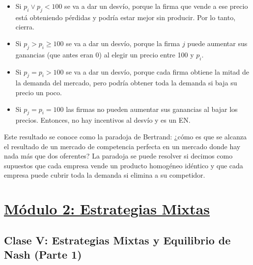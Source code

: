 \documentclass{article}
\begin{document}
                \begin{itemize}
                    \item Si \(p_{i} \vee p_{j} < 100\) se va a dar un desvío, porque la firma que vende a ese precio está obteniendo pérdidas y podría estar mejor sin producir. Por lo tanto, cierra.
                    \item Si \(p_{j} > p_{i} \geq 100\) se va a dar un desvío, porque la firma \(j\) puede aumentar sus ganancias (que antes eran 0) al elegir un precio entre 100 y \(p_{i}\).
                    \item Si \(p_{j} = p_{i} > 100\) se va a dar un desvío, porque cada firma obtiene la mitad de la demanda del mercado, pero podría obtener toda la demanda si baja su precio un poco.
                    \item Si \(p_{j} = p_{i} = 100\) las firmas no pueden aumentar sus ganancias al bajar los precios. Entonces, no hay incentivos al desvío y es un EN.
                \end{itemize}
                Este resultado se conoce como la paradoja de Bertrand: ¿cómo es que se alcanza el resultado de un mercado de competencia perfecta en un mercado donde hay nada más que dos oferentes? La paradoja se puede resolver si decimos como supuestos que cada empresa vende un producto homogéneo idéntico y que cada empresa puede cubrir toda la demanda si elimina a su competidor.
    \section*{\underline{Módulo 2: Estrategias Mixtas}}
        \subsection*{Clase V: Estrategias Mixtas y Equilibrio de Nash (Parte 1)}
\end{document}
